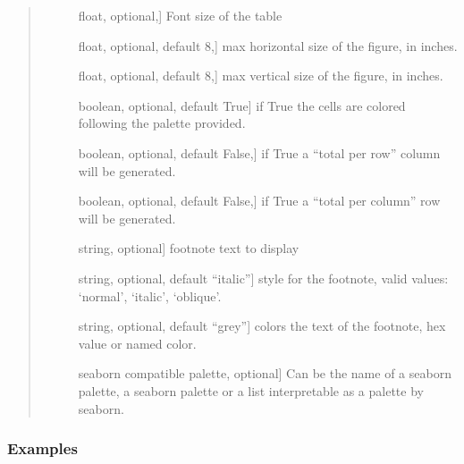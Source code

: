 \documentclass[letterpaper,10pt,english]{sphinxmanual}
\begin{document}
\begin{fulllineitems}
\begin{quote}
\begin{description}
\begin{description}
\item[{}] \leavevmode{[}float, optional,{]}
Font size of the table

\item[{}] \leavevmode{[}float, optional, default 8,{]}
max horizontal size of the figure, in inches.

\item[{}] \leavevmode{[}float, optional, default 8,{]}
max vertical size of the figure, in inches.

\item[{}] \leavevmode{[}boolean, optional, default True{]}
if True the cells are colored following the palette provided.

\item[{}] \leavevmode{[}boolean, optional, default False,{]}
if True a “total per row” column will be generated.

\item[{}] \leavevmode{[}boolean, optional, default False,{]}
if True a “total per column” row will be generated.

\item[{}] \leavevmode{[}string, optional{]}
footnote text to display

\item[{}] \leavevmode{[}string, optional, default “italic”{]}
style for the footnote, 
valid values: ‘normal’, ‘italic’, ‘oblique’.

\item[{}] \leavevmode{[}string, optional, default “grey”{]}
colors the text of the footnote, hex value or named color.

\item[{}] \leavevmode{[}seaborn compatible palette, optional{]}
Can be the name of a seaborn palette, 
a seaborn palette or a list interpretable 
as a palette by seaborn.

\end{description}

\end{description}\end{quote}
\subsubsection*{Examples}


\end{fulllineitems}
\end{document}
